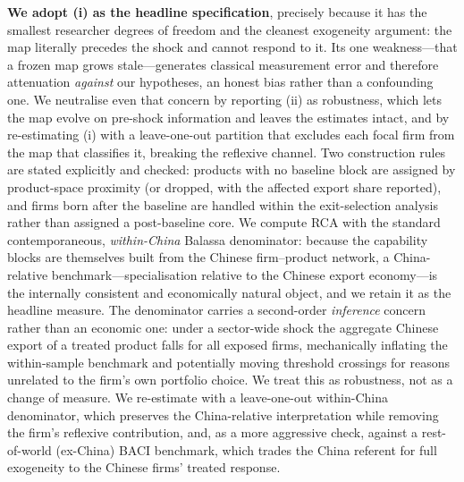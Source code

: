\textbf{We adopt (i) as the headline specification}, precisely because it has the
smallest researcher degrees of freedom and the cleanest exogeneity argument: the map
literally precedes the shock and cannot respond to it. Its one weakness---that a frozen
map grows stale---generates classical measurement error and therefore attenuation
\emph{against} our hypotheses, an honest bias rather than a confounding one. We
neutralise even that concern by reporting (ii) as robustness, which lets the map evolve
on pre-shock information and leaves the estimates intact, and by re-estimating (i) with
a leave-one-out partition that excludes each focal firm from the map that classifies
it, breaking the reflexive channel. Two construction rules are stated explicitly and
checked: products with no baseline block are assigned by product-space proximity (or
dropped, with the affected export share reported), and firms born after the baseline
are handled within the exit-selection analysis rather than assigned a post-baseline
core. We compute RCA with the standard contemporaneous, \emph{within-China} Balassa
denominator: because the capability blocks are themselves built from the Chinese
firm--product network, a China-relative benchmark---specialisation relative to the
Chinese export economy---is the internally consistent and economically natural object,
and we retain it as the headline measure. The denominator carries a second-order
\emph{inference} concern rather than an economic one: under a sector-wide shock the
aggregate Chinese export of a treated product falls for all exposed firms, mechanically
inflating the within-sample benchmark and potentially moving threshold crossings for
reasons unrelated to the firm's own portfolio choice. We treat this as robustness, not
as a change of measure. We re-estimate with a leave-one-out within-China denominator,
which preserves the China-relative interpretation while removing the firm's reflexive
contribution, and, as a more aggressive check, against a rest-of-world (ex-China) BACI
benchmark, which trades the China referent for full exogeneity to the Chinese firms'
treated response.

